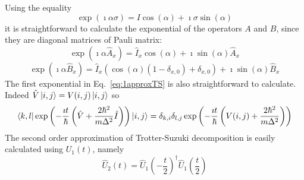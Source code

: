 Using the equality 
\begin{equation}
\exp(\imath \alpha \sigma) = I \cos(\alpha) + \imath \sigma \sin(\alpha)
\end{equation}
it is straightforward to calculate the exponential of the operators $A$ and $B$, since they are diagonal matrices of Pauli matrix:
\begin{equation}
\exp\left(\imath \alpha \hat{A}_x \right) = \hat{I}_x \cos(\alpha) + \imath \sin(\alpha) \hat{A}_x
\end{equation}
\begin{equation}
\exp\left(\imath \alpha \hat{B}_x \right) = \hat{I}_x (\cos(\alpha)(1-\delta_{x,0}) + \delta_{x,0}) + \imath \sin(\alpha) \hat{B}_x
\end{equation}
The first exponential in Eq.~\eqref{eq:1approxTS} is also straightforward to calculate. Indeed $\hat{V} \ket{i,j} = V(i,j) \ket{i,j}$ so
\begin{equation}
\bra{k,l} \exp\left(-\frac{\imath t}{\hbar}\left(\hat{V} + \frac{2 \hbar^2}{m \Delta^2} \hat{I}\right) \right) \ket{i,j} = \delta_{k,i} \delta_{l,j} \exp\left( -\frac{\imath t}{\hbar} \left( V(i,j) + \frac{2 \hbar^2}{m \Delta^2} \right) \right)
\end{equation}
The second order approximation of Trotter-Suzuki decomposition is easily calculated using $U_1(t)$, namely
\begin{equation}
\hat{U}_2(t) = \hat{U}_1\left( -\frac{t}{2} \right)^\dagger \hat{U}_1\left(\frac{t}{2}\right)
\end{equation}

